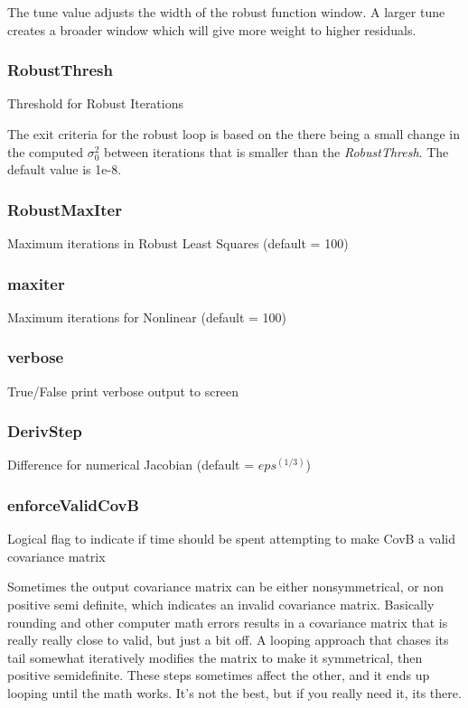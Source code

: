 \documentclass{article}
\begin{document}
	The tune value adjusts the width of the robust function window.  A larger tune creates a broader window which will give more weight to higher residuals.
	\subsubsection{RobustThresh}
	Threshold for Robust Iterations
	
	The exit criteria for the robust loop is based on the there being a small change in the computed $\sigma_0^2$ between iterations that is smaller than the \textit{RobustThresh}.  The default value is 1e-8.
	\subsubsection{RobustMaxIter}
	Maximum iterations in Robust Least Squares (default = 100)
	
	\subsubsection{maxiter}
	Maximum iterations for Nonlinear (default = 100)
	
	\subsubsection{verbose}
	True/False print verbose output to screen
	
	\subsubsection{DerivStep}
	Difference for numerical Jacobian (default = $eps^{(1/3)}$)
	
	\subsubsection{enforceValidCovB}
	Logical flag to indicate if time should be spent attempting to make CovB a valid covariance matrix
	
	Sometimes the output covariance matrix can be either nonsymmetrical, or non positive semi definite, which indicates an invalid covariance matrix.  Basically rounding and other computer math errors results in a covariance matrix that is really really close to valid, but just a bit off.  A looping approach that chases its tail somewhat iteratively modifies the matrix to make it symmetrical, then positive semidefinite.  These steps sometimes affect the other, and it ends up looping until the math works.  It's not the best, but if you really need it, its there.  
\end{document}
